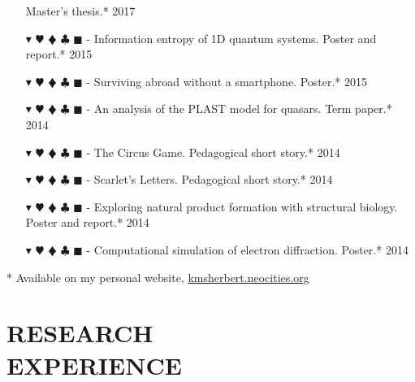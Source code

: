 \documentclass[overlapped, 10pt]{res} %
\newcommand{\physics}{$\blacktriangledown$}
\newcommand{\biochem}{$\varheartsuit$}
\newcommand{\shannon}{$\vardiamondsuit$}
\newcommand{\classic}{$\clubsuit$}
\newcommand{\quantum}{$\blacksquare$}
\newcommand{\physicscolor}{\color{YellowOrange}}
\newcommand{\biochemcolor}{\color{Emerald}}
\newcommand{\shannoncolor}{\color{Goldenrod}}
\newcommand{\classiccolor}{\color{Cyan}}
\newcommand{\quantumcolor}{\color{RedOrange}}
\newcommand{\tag}[1]{
    {\IfSubStr{#1}{\physics}{\physicscolor}{\color{White}}\physics}
    {\IfSubStr{#1}{\biochem}{\biochemcolor}{\color{White}}\biochem}
    {\IfSubStr{#1}{\shannon}{\shannoncolor}{\color{White}}\shannon}
    {\IfSubStr{#1}{\classic}{\classiccolor}{\color{White}}\classic}
    {\IfSubStr{#1}{\quantum}{\quantumcolor}{\color{White}}\quantum}
}
\begin{document}
\begin{resume}
\begin{itemize}
    \hfill Master's thesis.* 2017
\item[\tag{\physics\shannon\classic}-] Information entropy of 1D quantum systems.
    \hfill Poster and report.* 2015
\item[\tag{}-] Surviving abroad without a smartphone.
    \hfill Poster.* 2015
\item[\tag{\physics}-] An analysis of the PLAST model for quasars.
    \hfill Term paper.* 2014
\item[\tag{\shannon}-] The Circus Game.
    \hfill Pedagogical short story.* 2014
\item[\tag{\physics}-] Scarlet's Letters.
    \hfill Pedagogical short story.* 2014
\item[\tag{\biochem}-] Exploring natural product formation with structural biology.
    \hfill Poster and report.* 2014
\item[\tag{\physics\classic}-] Computational simulation of electron diffraction.
    \hfill Poster.* 2014
\end{itemize}

* Available on my personal website, \href{kmsherbert.neocities.org}{kmsherbert.neocities.org}


\section{RESEARCH\\EXPERIENCE}


\end{resume}
\end{document}
